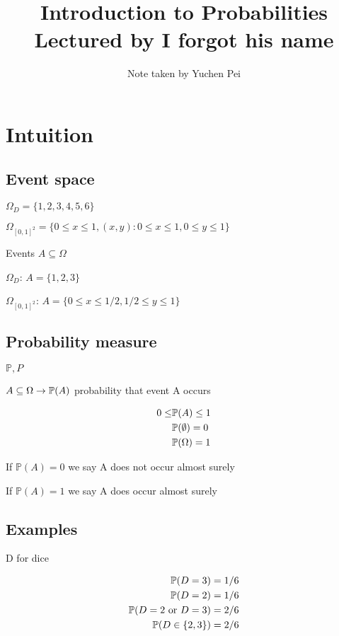 

\title{Introduction to Probabilities\\{\small Lectured by I forgot his name}}
\author{Note taken by Yuchen Pei}
\date{}

\maketitle

\section{Intuition}

\subsection{Event space}

$\Omega_D=\{ 1,2,3,4,5,6 \}$

$\Omega_{[0,1]^2}=\{ 0\leq x\leq 1, (x,y):0\leq x \leq 1, 0\leq y \leq 1 \}$

Events $A\subseteq \Omega$

$\Omega_D$: $A=\{ 1,2,3 \}$

$\Omega_{[0,1]^2}$: $A=\{0\leq x\leq 1/2, 1/2\leq y\leq 1\}$

\subsection{Probability measure}

$\mathbb{P},P$

$A \subseteq \Omega \rightarrow \mathbb{P}(A)$ probability that event A occurs

\begin{align*}
0\leq & \mathbb{P}(A) \leq 1
\\
&\mathbb{P}(\emptyset)=0
\\
&\mathbb{P}(\Omega)=1
\end{align*}

If $\mathbb{P}(A)=0$ we say A does not occur almost surely

If $\mathbb{P}(A)=1$ we say A does occur almost surely



\subsection{Examples}

D for dice

\begin{align*}
\mathbb{P}(D=3)&=1/6
\\
\mathbb{P}(D=2)&=1/6
\\
\mathbb{P}(D=2\text{ or }D=3)&=2/6
\\
\mathbb{P}(D\in\{2,3\})&=2/6
\end{align*}

